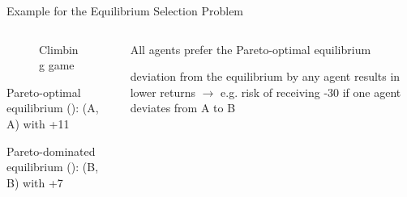 \begin{frame}[t]{Example for the Equilibrium Selection Problem}
    \begin{columns}
        \begin{column}{.40\textwidth}
            \begin{figure}
                \centering
                \caption{Climbing game}
            \end{figure}

            \vspace{1em}
            \blist
                \item Pareto-optimal equilibrium (\ddag): (A, A) with +11
                \item Pareto-dominated equilibrium (\dag): (B, B) with +7
            \elist
        \end{column}
        \begin{column}{.60\textwidth}
            \blist
                \item<2-> All agents prefer the Pareto-optimal equilibrium
                    \item<2->  deviation from the equilibrium by any agent results in lower returns $\rightarrow$ e.g. risk of receiving -30 if one agent deviates from A to B
            \elist

            \vspace{-.5em}


        \end{column}
    \end{columns}
\end{frame}

